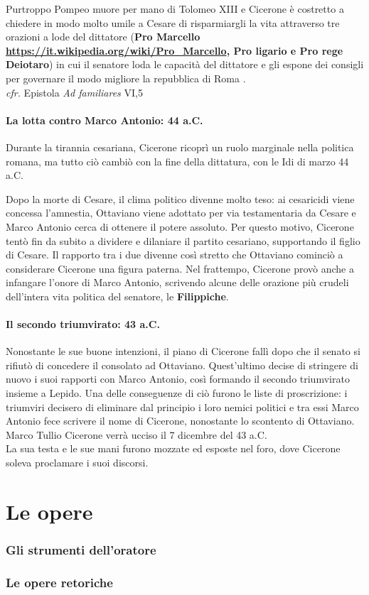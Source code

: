 \documentclass[10pt,a4paper]{article}
\begin{document}
Purtroppo Pompeo muore per mano di Tolomeo XIII e Cicerone è costretto a chiedere in modo molto umile a Cesare di risparmiargli la vita attraverso tre orazioni a lode del dittatore (\textbf{Pro Marcello \url{https://it.wikipedia.org/wiki/Pro_Marcello}, Pro ligario e Pro rege Deiotaro}) in cui il senatore loda le capacità del dittatore e gli espone dei consigli per governare il modo migliore la repubblica di Roma . \\

\textit{cfr.} Epistola \textit{Ad familiares} VI,5

\subsection*{La lotta contro Marco Antonio: 44 a.C.}

Durante la tirannia cesariana, Cicerone ricoprì un ruolo marginale nella politica romana, ma tutto ciò cambiò con la fine della dittatura, con le Idi di marzo 44 a.C.

Dopo la morte di Cesare, il clima politico divenne molto teso: ai cesaricidi viene concessa l'amnestia, Ottaviano viene adottato per via testamentaria da Cesare e Marco Antonio cerca di ottenere il potere assoluto. Per questo motivo, Cicerone tentò fin da subito a dividere e dilaniare il partito cesariano, supportando il figlio di Cesare. Il rapporto tra i due divenne così stretto che Ottaviano cominciò a considerare Cicerone una figura paterna. Nel frattempo, Cicerone provò anche a infangare l'onore di Marco Antonio, scrivendo alcune delle orazione più crudeli dell'intera vita politica del senatore, le \textbf{Filippiche}.

\subsection*{Il secondo triumvirato: 43 a.C.}

Nonostante le sue buone intenzioni, il piano di Cicerone fallì dopo che il senato si rifiutò di concedere il consolato ad Ottaviano. Quest'ultimo decise di stringere di nuovo i suoi rapporti con Marco Antonio, così formando il secondo triumvirato insieme a Lepido. Una delle conseguenze di ciò furono le liste di proscrizione: i triumviri decisero di eliminare dal principio i loro nemici politici e tra essi Marco Antonio fece scrivere il nome di Cicerone, nonostante lo scontento di Ottaviano. Marco Tullio Cicerone verrà ucciso il 7 dicembre del 43 a.C.\\

La sua testa e le sue mani furono mozzate ed esposte nel foro, dove Cicerone soleva proclamare i suoi discorsi. 

\part*{Le opere}

\section*{Gli strumenti dell'oratore}



\section*{Le opere retoriche}
\end{document}
